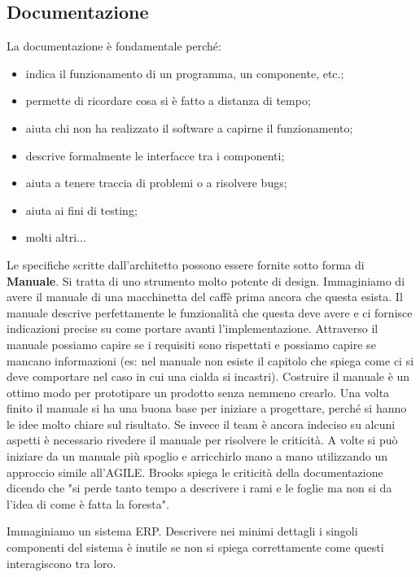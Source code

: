 \subsection{Documentazione}
La documentazione è fondamentale perché:
\begin{itemize}
	\item indica il funzionamento di un programma, un componente, etc.;
	\item permette di ricordare cosa si è fatto a distanza di tempo;
	\item aiuta chi non ha realizzato il software a capirne il funzionamento;
	\item descrive formalmente le interfacce tra i componenti;
	\item aiuta a tenere traccia di problemi o a risolvere bugs;
	\item aiuta ai fini di testing;
	\item molti altri...
\end{itemize}
Le specifiche scritte dall'architetto possono essere fornite sotto forma di \textbf{Manuale}. Si tratta di uno strumento molto potente di design.\newline
Immaginiamo di avere il manuale di una macchinetta del caffè prima ancora che questa esista. Il manuale descrive perfettamente le funzionalità che questa deve avere e ci fornisce indicazioni precise su come portare avanti l'implementazione. Attraverso il manuale possiamo capire se i requisiti sono rispettati e possiamo capire se mancano informazioni (es: nel manuale non esiste il capitolo che spiega come ci si deve comportare nel caso in cui una cialda si incastri).\newline
Costruire il manuale è un ottimo modo per prototipare un prodotto senza nemmeno crearlo. Una volta finito il manuale si ha una buona base per iniziare a progettare, perché si hanno le idee molto chiare sul risultato. Se invece il team è ancora indeciso su alcuni aspetti è necessario rivedere il manuale per risolvere le criticità.\newline
A volte si può iniziare da un manuale più spoglio e arricchirlo mano a mano utilizzando un approccio simile all'AGILE.\newline
Brooks spiega le criticità della documentazione dicendo che "si perde tanto tempo a descrivere i rami e le foglie ma non si da l'idea di come è fatta la foresta".
\begin{info}[Esempio]
	Immaginiamo un sistema ERP. Descrivere nei minimi dettagli i singoli componenti del sistema è inutile se non si spiega correttamente come questi interagiscono tra loro.
\end{info}
